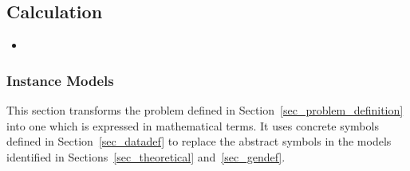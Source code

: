 \documentclass[12pt]{article}
\begin{document}

\subsection{Calculation} \label{sec_Calculation}
\begin{itemize}
	\item
\end{itemize}
%
%

\subsubsection{Instance Models} \label{sec_instance}    


This section transforms the problem defined in 
Section~\ref{sec_problem_definition} into one which is expressed in 
mathematical terms. It uses concrete symbols defined in 
Section~\ref{sec_datadef} to replace the abstract symbols in the models 
identified in Sections~\ref{sec_theoretical} and~\ref{sec_gendef}.

\end{document}
